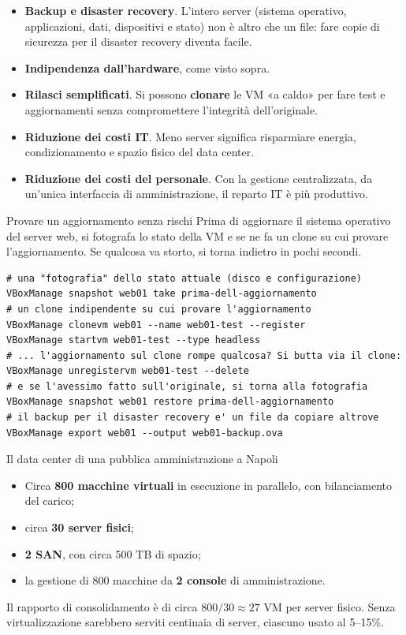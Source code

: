 \begin{itemize}
  \item \textbf{Backup e disaster recovery}. L'intero server (sistema operativo, applicazioni, dati, dispositivi e stato)
        non è altro che un file: fare copie di sicurezza per il disaster recovery diventa facile.
  \item \textbf{Indipendenza dall'hardware}, come visto sopra.
  \item \textbf{Rilasci semplificati}. Si possono \textbf{clonare} le VM «a caldo» per fare test e aggiornamenti senza
        compromettere l'integrità dell'originale.
  \item \textbf{Riduzione dei costi IT}. Meno server significa risparmiare energia, condizionamento e spazio fisico del
        data center.
  \item \textbf{Riduzione dei costi del personale}. Con la gestione centralizzata, da un'unica interfaccia di
        amministrazione, il reparto IT è più produttivo.
\end{itemize}

\begin{esempio}{Provare un aggiornamento senza rischi}
Prima di aggiornare il sistema operativo del server web, si fotografa lo stato della VM e se ne fa un clone su cui
provare l'aggiornamento. Se qualcosa va storto, si torna indietro in pochi secondi.
\begin{lstlisting}[style=shell, name=aggiornamento.sh]
# una "fotografia" dello stato attuale (disco e configurazione)
VBoxManage snapshot web01 take prima-dell-aggiornamento
# un clone indipendente su cui provare l'aggiornamento
VBoxManage clonevm web01 --name web01-test --register
VBoxManage startvm web01-test --type headless
# ... l'aggiornamento sul clone rompe qualcosa? Si butta via il clone:
VBoxManage unregistervm web01-test --delete
# e se l'avessimo fatto sull'originale, si torna alla fotografia
VBoxManage snapshot web01 restore prima-dell-aggiornamento
# il backup per il disaster recovery e' un file da copiare altrove
VBoxManage export web01 --output web01-backup.ova
\end{lstlisting}
\end{esempio}

\begin{esempio}{Il data center di una pubblica amministrazione a Napoli}
\begin{itemize}
  \item Circa \textbf{800 macchine virtuali} in esecuzione in parallelo, con bilanciamento del carico;
  \item circa \textbf{30 server fisici};
  \item \textbf{2 SAN}, con circa 500 TB di spazio;
  \item la gestione di 800 macchine da \textbf{2 console} di amministrazione.
\end{itemize}
Il rapporto di consolidamento è di circa $800/30 \approx 27$ VM per server fisico. Senza virtualizzazione sarebbero serviti
centinaia di server, ciascuno usato al 5--15\%.
\end{esempio}

